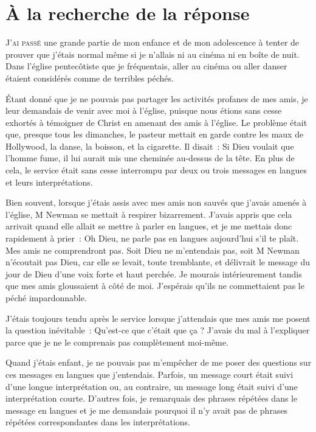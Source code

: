 \chapter{\`A la recherche de la r\'eponse}

\lettrine{J}{'ai passé}
 une grande partie de mon enfance et de mon
 adolescence à tenter de prouver que j'étais normal même si je n'allais ni au
 cinéma ni en boîte de nuit. Dans l'église pentecôtiste que je fréquentais,
 aller au cinéma ou aller danser étaient considérés comme de terribles péchés.

Étant donné que je ne pouvais pas partager les activités profanes
 de mes amis, je leur demandais de venir avec moi à l'église,
 puisque nous étions sans cesse exhortés à témoigner de Christ en amenant
 des amis à l'église. Le problème était que, presque tous les dimanches,
 le pasteur mettait en garde contre les
 maux de Hollywood, la danse, la boisson, et la cigarette.
 Il disait~: \og Si Dieu voulait que l'homme fume, il lui aurait mis une
 cheminée au-dessus de la tête.\fg{}
 En plus de cela, le service était sans cesse interrompu par deux ou trois
 \og messages en langues \fg{} et leurs interprétations.

Bien souvent, lorsque j'étais assis avec mes amis non sauvés que j'avais
 amenés à l'église, M Newman se mettait à respirer bizarrement.
 J'avais appris que cela arrivait quand elle allait se mettre à parler en
 langues, et je me mettais donc rapidement à prier~:
 \og Oh Dieu, ne parle pas en langues aujourd'hui s'il te plaît.
 Mes amis ne comprendront pas. \fg{}
 Soit Dieu ne m'entendais pas, soit M Newman n'écoutait pas Dieu,
 car elle se levait, toute tremblante, et délivrait le message du jour de Dieu
 d'une voix forte et haut perchée. Je mourais intérieurement tandis que mes amis
 gloussaient à côté de moi. J'espérais qu'ils ne commettaient pas le péché
 impardonnable.

J'étais toujours tendu après le service lorsque j'attendais que mes amis me
 posent la question inévitable~:
 \og Qu'est-ce que c'était que ça ? \fg{}
 J'avais du mal à l'expliquer parce que je ne le comprenais pas complètement
 moi-même.
\noclub[3]

Quand j'étais enfant, je ne pouvais pas m'empêcher de me poser des questions sur
 ces \og messages en langues \fg{} que j'entendais. Parfois, un message court
 était suivi d'une longue interprétation ou, au contraire, un message long était
 suivi d'une interprétation courte. D'autres fois, je remarquais des phrases
 répétées dans le message en langues et je me demandais pourquoi il n'y avait
 pas de phrases répétées correspondantes dans les interprétations.

